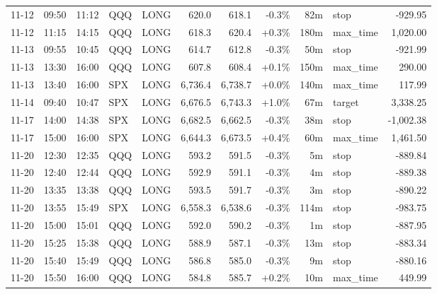 \documentclass[11pt,a4paper,twoside]{article}
\begin{document}
\begin{center}
\begin{longtable}{>{\color{txtmain}}l l l l l r r r r >{\color{txtmain}}l r}
11-12 & 09:50 & 11:12 & QQQ & LONG & 620.0 & 618.1 & \textcolor{lossred}{-0.3\%} & 82m & stop & \textcolor{lossred}{-929.95} \\
11-12 & 11:15 & 14:15 & QQQ & LONG & 618.3 & 620.4 & \textcolor{wingreen}{+0.3\%} & 180m & max\_time & \textcolor{wingreen}{1,020.00} \\
11-13 & 09:55 & 10:45 & QQQ & LONG & 614.7 & 612.8 & \textcolor{lossred}{-0.3\%} & 50m & stop & \textcolor{lossred}{-921.99} \\
11-13 & 13:30 & 16:00 & QQQ & LONG & 607.8 & 608.4 & \textcolor{wingreen}{+0.1\%} & 150m & max\_time & \textcolor{wingreen}{290.00} \\
11-13 & 13:40 & 16:00 & SPX & LONG & 6,736.4 & 6,738.7 & \textcolor{wingreen}{+0.0\%} & 140m & max\_time & \textcolor{wingreen}{117.99} \\
11-14 & 09:40 & 10:47 & SPX & LONG & 6,676.5 & 6,743.3 & \textcolor{wingreen}{+1.0\%} & 67m & target & \textcolor{wingreen}{3,338.25} \\
11-17 & 14:00 & 14:38 & SPX & LONG & 6,682.5 & 6,662.5 & \textcolor{lossred}{-0.3\%} & 38m & stop & \textcolor{lossred}{-1,002.38} \\
11-17 & 15:00 & 16:00 & SPX & LONG & 6,644.3 & 6,673.5 & \textcolor{wingreen}{+0.4\%} & 60m & max\_time & \textcolor{wingreen}{1,461.50} \\
11-20 & 12:30 & 12:35 & QQQ & LONG & 593.2 & 591.5 & \textcolor{lossred}{-0.3\%} & 5m & stop & \textcolor{lossred}{-889.84} \\
11-20 & 12:40 & 12:44 & QQQ & LONG & 592.9 & 591.1 & \textcolor{lossred}{-0.3\%} & 4m & stop & \textcolor{lossred}{-889.38} \\
11-20 & 13:35 & 13:38 & QQQ & LONG & 593.5 & 591.7 & \textcolor{lossred}{-0.3\%} & 3m & stop & \textcolor{lossred}{-890.22} \\
11-20 & 13:55 & 15:49 & SPX & LONG & 6,558.3 & 6,538.6 & \textcolor{lossred}{-0.3\%} & 114m & stop & \textcolor{lossred}{-983.75} \\
11-20 & 15:00 & 15:01 & QQQ & LONG & 592.0 & 590.2 & \textcolor{lossred}{-0.3\%} & 1m & stop & \textcolor{lossred}{-887.95} \\
11-20 & 15:25 & 15:38 & QQQ & LONG & 588.9 & 587.1 & \textcolor{lossred}{-0.3\%} & 13m & stop & \textcolor{lossred}{-883.34} \\
11-20 & 15:40 & 15:49 & QQQ & LONG & 586.8 & 585.0 & \textcolor{lossred}{-0.3\%} & 9m & stop & \textcolor{lossred}{-880.16} \\
11-20 & 15:50 & 16:00 & QQQ & LONG & 584.8 & 585.7 & \textcolor{wingreen}{+0.2\%} & 10m & max\_time & \textcolor{wingreen}{449.99} \\

\end{longtable}
\end{center}
\end{document}
